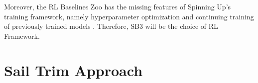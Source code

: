 \documentclass[12pt,twoside]{report}
\begin{document}
Moreover, the RL Baselines Zoo has the missing features of Spinning Up's training framework, namely hyperparameter optimization and continuing training of previously trained models \cite{rl-zoo3}. Therefore, SB3 will be the choice of RL Framework.










\appendix
{}
\chapter{Sail Trim Approach}

\end{document}
